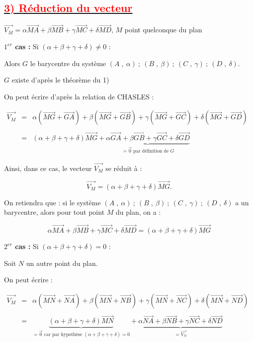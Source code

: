 \documentclass{article}
\begin{document}
\subsection*{\underline{\textbf{\textcolor{red}{3) Réduction du vecteur}}}}
$\overrightarrow{V_{M}}=\alpha\overrightarrow{MA}+\beta\overrightarrow{MB}+\gamma\overrightarrow{MC}+\delta\overrightarrow{MD}$, $M$ point quelconque du plan

\textbf{$1^{er}$ cas :} Si $(\alpha+\beta+\gamma+\delta)\neq 0$ :

Alors $G$ le barycentre du système ${(A\;,\ \alpha)\ ;\ (B\;,\ \beta)\ ;\ (C\;,\ \gamma)\ ;\ (D\;,\ \delta)}.$

$G$ existe d'après le théorème du 1)

On peut écrire d'après la relation de CHASLES :

$\begin{array}{rcl}\overrightarrow{V_{M}}&=&\alpha\left(\overrightarrow{MG}+\overrightarrow{GA}\right)+\beta\left(\overrightarrow{MG}+\overrightarrow{GB}\right)+\gamma\left(\overrightarrow{MG}+\overrightarrow{GC}\right)+\delta\left(\overrightarrow{MG}+\overrightarrow{GD}\right)\\ \\&=&(\alpha+\beta+\gamma+\delta)\overrightarrow{MG}+\underbrace{\alpha\overrightarrow{GA}+\beta\overrightarrow{GB}+\gamma\overrightarrow{GC}+\delta\overrightarrow{GD}}_{=\overrightarrow{0}\text{ par définition de }G}\end{array}$

Ainsi, dans ce cas, le vecteur $\overrightarrow{V_{M}}$ se réduit à :

$$\overrightarrow{V_{M}}=(\alpha+\beta+\gamma+\delta)\overrightarrow{MG}.$$

On retiendra que : si le système ${(A\;,\ \alpha)\ ;\ (B\;,\ \beta)\ ;\ (C\;,\ \gamma)\ ;\ (D\;,\ \delta)}$ a un barycentre, alors pour tout point $M$ du plan, on a :

$$\alpha\overrightarrow{MA}+\beta\overrightarrow{MB}+\gamma\overrightarrow{MC}+\delta\overrightarrow{MD}=(\alpha+\beta+\gamma+\delta)\overrightarrow{MG}$$

\textbf{$2^{er}$ cas :} Si $(\alpha+\beta+\gamma+\delta)=0$ :

Soit $N$ un autre point du plan.

On peut écrire :

$\begin{array}{rcl}\overrightarrow{V_{M}}&=&\alpha\left(\overrightarrow{MN}+\overrightarrow{NA}\right)+\beta\left(\overrightarrow{MN}+\overrightarrow{NB}\right)+\gamma\left(\overrightarrow{MN}+\overrightarrow{NC}\right)+\delta\left(\overrightarrow{MN}+\overrightarrow{ND}\right)\\ \\&=&\underbrace{(\alpha+\beta+\gamma+\delta)\overrightarrow{MN}}_{=\overrightarrow{0}\text{ car par hypothèse }(\alpha+\beta+\gamma+\delta)=0}+\underbrace{\alpha\overrightarrow{NA}+\beta\overrightarrow{NB}+\gamma\overrightarrow{NC}+\delta\overrightarrow{ND}}_{=\overrightarrow{V_{N}}}\end{array}$
\end{document}
